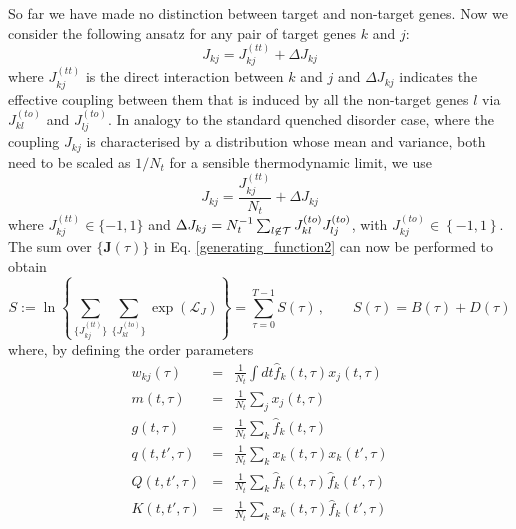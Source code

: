 \documentclass[%
 reprint,
superscriptaddress,
 amsmath,amssymb,
 prl,
]{revtex4-2}
\begin{document}
So far we have made no distinction between target and non-target genes. Now we  consider the following ansatz for any pair of target genes $k$ and $j$:
\begin{equation}
    J_{kj} = J^{(tt)}_{kj} + \Delta J_{kj}
\end{equation}
where $J^{(tt)}_{kj}$ is the direct interaction between $k$ and $j$ and $\Delta J_{kj}$ indicates the effective coupling between them that is induced by all the non-target genes $l$ via $J^{(to)}_{kl}$ and $J^{(to)}_{lj}$. In analogy to the standard quenched disorder case, where the  coupling $  J_{kj} $ is characterised by a distribution whose mean and  variance, both need to be scaled as $1/N_t$ for a sensible thermodynamic limit, we use
\begin{equation}
    J_{kj} = \frac{J^{(tt)}_{kj}}{N_t} + \Delta J_{kj}
\end{equation}
where $J^{(tt)}_{kj} \in \{ -1,1 \}$ and $
   \Delta J_{kj} = N_t^{-1}\sum_{l\centernot \in \mathcal{T}} J^{(to)}_{kl} J^{(to)}_{lj}$, with $J^{(to)}_{kj} \in \left\{ -1, 1\right\}$. The sum over $\{\mathbf{J}(\tau)\}$ in Eq. \eqref{generating_function2} can now be performed 
 to obtain
 \begin{equation}
   S := \ln\left\{\sum_{\big\{J^{(tt)}_{kj}\big\}} \sum_{\big\{J^{(to)}_{kl}\big\}}  \exp ( \mathcal{L}_J) \right\}  =\sum_{\tau=0}^{T-1} S(\tau)\,,\qquad  S(\tau) = B(\tau) +  D(\tau)  
\label{generating_function4a}
\end{equation}
where, by defining the order parameters
\begin{subequations}
\label{allequations7}
 \begin{eqnarray}
 w_{kj}(\tau) &= &\frac{1}{N_t}\int dt  \hat{f}_k(t,\tau) x_j(t,\tau)
  \label{auxiliary1}
\\  m(t,\tau) & =&  \frac{1}{N_t}\sum_j x_j (t,\tau) 
  \label{auxiliary2}
  \\  g(t,\tau) &=& \frac{1}{N_t}\sum_k \hat{f}_k (t,\tau) 
  \label{auxiliary3} 
  \\ q(t,t',\tau) &= &  \frac{1}{N_t}\sum_{k} x_k(t,\tau) x_k(t',\tau)
  \label{auxiliary4}
\\ Q(t,t',\tau) &= & \frac{1}{N_t}\sum_{k} \hat{f}_k(t,\tau) \hat{f}_k(t',\tau) 
  \label{auxiliary5}
  \\ K(t,t',\tau) &= &  \frac{1}{N_t}\sum_{k} x_k(t,\tau) \hat{f}_k(t',\tau)
  \label{auxiliary6}
\end{eqnarray}
\end{subequations}
\end{document}
